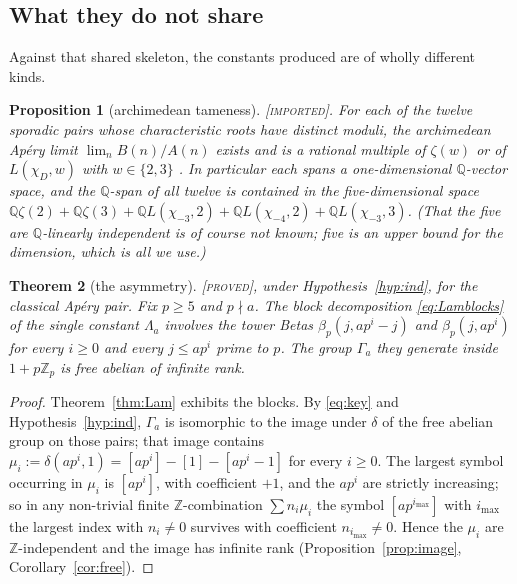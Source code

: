 \documentclass[11pt,reqno]{article}
\newcommand{\Zp}{\mathbb{Z}_p}
\newcommand{\QQ}{\mathbb{Q}}
\newcommand{\ZZ}{\mathbb{Z}}
\newcommand{\bet}{\beta_p}
\newcommand{\PROVED}{{\normalfont\textsc{[proved]}}}
\newcommand{\IMPORTED}{{\normalfont\textsc{[imported]}}}
\theoremstyle{plain}
\newtheorem{theorem}{Theorem}[section]
\newtheorem{proposition}[theorem]{Proposition}
\theoremstyle{definition}
\theoremstyle{remark}
\numberwithin{equation}{section}
\begin{document}
\subsection{What they do not share}

Against that shared skeleton, the constants produced are of wholly different
kinds.

\begin{proposition}[archimedean tameness]\label{prop:tame}
\IMPORTED.  For each of the twelve sporadic pairs whose characteristic roots have
distinct moduli, the archimedean Ap\'ery limit $\lim_nB(n)/A(n)$ exists and is a
rational multiple of $\zeta(w)$ or of $L(\chi_D,w)$ with $w\in\{2,3\}$
\cite{Zagier2009,ASvSZ2008,ChamberlandStraub,PaperA}.  In particular each spans a
one-dimensional $\QQ$-vector space, and the $\QQ$-span of all twelve is
contained in the five-dimensional space
$\QQ\zeta(2)+\QQ\zeta(3)+\QQ L(\chi_{-3},2)+\QQ L(\chi_{-4},2)+\QQ L(\chi_{-3},3)$.
(That the five are $\QQ$-linearly independent is of course not known; five is an
upper bound for the dimension, which is all we use.)
\end{proposition}

\begin{theorem}[the asymmetry]\label{thm:asym}
\PROVED, under Hypothesis~\ref{hyp:ind}, for the classical Ap\'ery pair.
Fix $p\ge5$ and $p\nmid a$.  The block decomposition \eqref{eq:Lamblocks} of the
single constant $\Lambda_a$ involves the tower Betas $\bet(j,ap^i-j)$ and
$\bet(j,ap^i)$ for every $i\ge0$ and every $j\le ap^i$ prime to $p$.  The group
$\Gamma_a$ they generate inside $1+p\Zp$ is free abelian of infinite rank.
\end{theorem}

\begin{proof}
Theorem~\ref{thm:Lam} exhibits the blocks.  By \eqref{eq:key} and
Hypothesis~\ref{hyp:ind}, $\Gamma_a$ is isomorphic to the image under $\delta$
of the free abelian group on those pairs; that image contains
$\mu_i:=\delta(ap^i,1)=[ap^i]-[1]-[ap^i-1]$ for every $i\ge0$.  The largest
symbol occurring in $\mu_i$ is $[ap^i]$, with coefficient $+1$, and the $ap^i$
are strictly increasing; so in any non-trivial finite $\ZZ$-combination
$\sum n_i\mu_i$ the symbol $[ap^{i_{\max}}]$ with $i_{\max}$ the largest index
with $n_{i}\ne0$ survives with coefficient $n_{i_{\max}}\ne0$.  Hence the $\mu_i$
are $\ZZ$-independent and the image has infinite rank
(Proposition~\ref{prop:image}, Corollary~\ref{cor:free}).
\end{proof}
\end{document}
